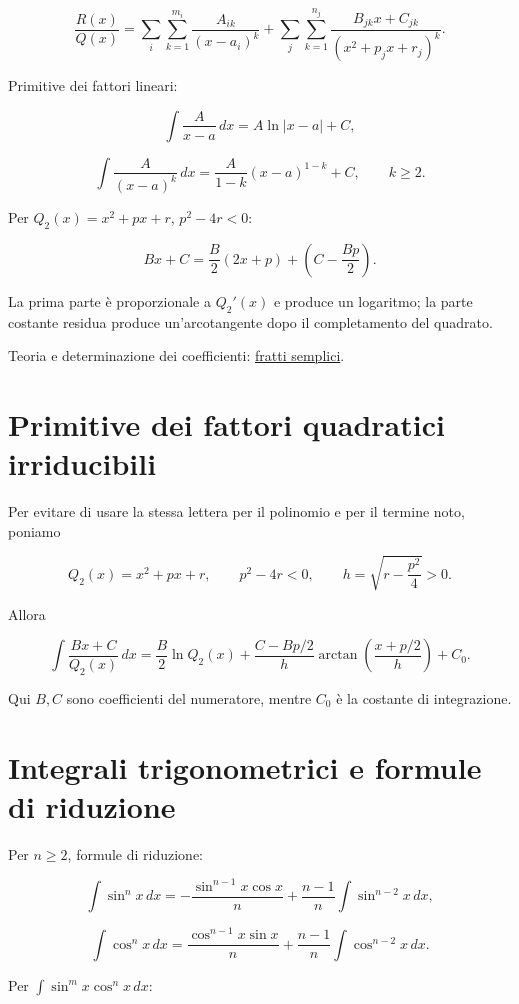 \[
\displaystyle
\frac{R(x)}{Q(x)}
=
\sum_i\sum_{k=1}^{m_i}\frac{A_{ik}}{(x-a_i)^k}
+
\sum_j\sum_{k=1}^{n_j}
\frac{B_{jk}x+C_{jk}}{(x^2+p_jx+r_j)^k}.
\]

Primitive dei fattori lineari:

\[
\displaystyle
\int\frac{A}{x-a}\,dx
=
A\ln\lvert x-a\rvert+C,
\]

\[
\displaystyle
\int\frac{A}{(x-a)^k}\,dx
=
\frac{A}{1-k}(x-a)^{1-k}+C,
\qquad k\ge2.
\]

Per \(Q_2(x)=x^2+px+r\), \(p^2-4r<0\):

\[
\displaystyle
Bx+C
=
\frac B2(2x+p)+\left(C-\frac{Bp}{2}\right).
\]

La prima parte è proporzionale a \(Q_2'(x)\) e produce un logaritmo; la parte costante residua produce un'arcotangente dopo il completamento del quadrato.

Teoria e determinazione dei coefficienti: \href{https://ingegnerismo.it/matematica/fratti-semplici/}{fratti semplici}.

\section{Primitive dei fattori quadratici irriducibili}\label{primitive-dei-fattori-quadratici-irriducibili}

Per evitare di usare la stessa lettera per il polinomio e per il termine noto, poniamo

\[
Q_2(x)=x^2+px+r,
\qquad
p^2-4r<0,
\qquad
h=\sqrt{r-\frac{p^2}{4}}>0.
\]

Allora

\[
\int\frac{Bx+C}{Q_2(x)}\,dx
=
\frac B2\ln Q_2(x)
+
\frac{C-Bp/2}{h}
\arctan\left(\frac{x+p/2}{h}\right)+C_0.
\]

Qui \(B,C\) sono coefficienti del numeratore, mentre \(C_0\) è la costante di integrazione.

\section{Integrali trigonometrici e formule di riduzione}\label{integrali-trigonometrici-e-formule-di-riduzione}

Per \(n\ge2\), formule di riduzione:

\[
\int\sin^n x\,dx
=-\frac{\sin^{n-1}x\cos x}{n}
+\frac{n-1}{n}\int\sin^{n-2}x\,dx,
\]

\[
\int\cos^n x\,dx
=\frac{\cos^{n-1}x\sin x}{n}
+\frac{n-1}{n}\int\cos^{n-2}x\,dx.
\]

Per \(\int\sin^m x\cos^n x\,dx\):

